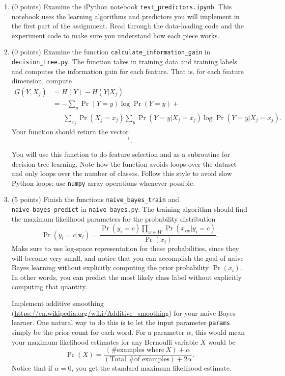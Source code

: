 \documentclass[10pt]{article}
\newcommand{\bx}{{\boldsymbol x}}
\begin{document}
\begin{enumerate}

\item (0 points) Examine the iPython notebook \texttt{test\_predictors.ipynb}. This notebook uses the learning algorithms and predictors you will implement in the first part of the assignment. Read through the data-loading code and the experiment code to make sure you understand how each piece works.

\item (0 points) Examine the function \texttt{calculate\_information\_gain} in \texttt{decision\_tree.py}. The function takes in training data and training labels and computes the information gain for each feature. That is, for each feature dimension, compute
\begin{equation}
\begin{aligned}
G(Y, X_j) &= H(Y) - H(Y|X_j)\\
&= - \sum_{y} \Pr(Y = y) \log \Pr(Y = y) +\\
&~~~~~~~ \sum_{x_j} \Pr(X_j = x_j) \sum_{y} \Pr(Y = y | X_j = x_j) \log \Pr(Y = y | X_j = x_j).
\end{aligned}
\label{eq:infogain}
\end{equation}
Your function should return the vector
\begin{equation}
[G(Y, X_1), \ldots, G(Y, X_d)]^\top.
\end{equation}

You will use this function to do feature selection and as a subroutine for decision tree learning. Note how the function avoids loops over the dataset and only loops over the number of classes. Follow this style to avoid slow Python loops; use \texttt{numpy} array operations whenever possible. 

\item (5 points) Finish the functions \texttt{naive\_bayes\_train} and \texttt{naive\_bayes\_predict} in \texttt{naive\_bayes.py}. The training algorithm should find the maximum likelihood parameters for the probability distribution
\[
\Pr(y_i = c | \bx_i) = \frac{\Pr(y_i = c) \prod_{w \in W} \Pr(x_{iw} | y_i = c)}{\Pr(x_i)}.
\]
Make sure to use log-space representation for these probabilities, since they will become very small, and notice that you can accomplish the goal of naive Bayes learning without explicitly computing the prior probability $\Pr(x_i)$. In other words, you can predict the most likely class label without explicitly computing that quantity. 

Implement additive smoothing (\url{https://en.wikipedia.org/wiki/Additive_smoothing}) for your naive Bayes learner. One natural way to do this is to let the input parameter \texttt{params} simply be the prior count for each word. For a parameter $\alpha$, this would mean your maximum likelihood estimates for any Bernoulli variable $X$ would be 
\[
\Pr(X) = \frac{(\textrm{\# examples where}~X) + \alpha}{(\textrm{Total \# of examples}) + 2 \alpha}.
\]
Notice that if $\alpha = 0$, you get the standard maximum likelihood estimate.


\end{enumerate}
\end{document}
